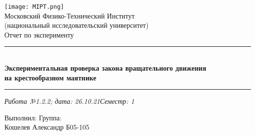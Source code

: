 \documentclass[12pt,a4paper]{scrartcl}
\begin{document}
	\graphicspath{{C:/Users/Alex/OneDrive/Изображения/TexImgs}}
	
	\newcommand{\ms}{\mathstrut}
	\newcommand{\msp}{\hspace{0.5cm}}
	\newcommand{\al}{\alpha}
	\newcommand{\dg}{^\circ}
	\newcommand{\qd}[2]{^{\frac{#1}{#2}}}
	\newcommand{\qdm}[2]{^{-\frac{#1}{#2}}}
	\newcommand{\lm}[2]{\underset{#1 \rightarrow #2}{\lim}}
	\newcommand{\sfrac}[2]{\dfrac{\strut #1}{\strut #2}}
	\newcommand{\equal}[1]{\overset{(#1)}{=}}
	\newcommand{\linevdots}{\ \raisebox{-.08\height}{\vdots}\ }
	\newcommand{\linecvdots}{\ \raisebox{-.08\height}{\vdots}\hspace{-0.13cm}\raisebox{.15\height}{\cancel{\phantom{a}}\hspace{0.06cm}}}
	\newcommand{\combox}[1]{\ms \msp \msp \begin{minipage}{0.95\linewidth}
			#1
	\end{minipage}}
	
	\newtheorem{pr}{Задача}
	\newtheorem{ex}{Пример}
	\newtheorem{dfn}{Def}
	\newtheorem{theorem}{Th}
	
	\newenvironment{slv}{\ms \msp \textit{Решение:}}{}
	\newenvironment{proof}{\ms \msp \textit{Доказательство: }}{\hfill $\square$}
	
	\begin{titlepage}
		
		\vspace*{\fill}
		
		\begin{center}
			\texttt{[image: MIPT.png]}
			\\[0.7cm]\Huge Московский Физико-Технический Институт\\(национальный исследовательский университет)
			\\[2cm]\LARGE Отчет по эксперименту
			\\[0.5cm]\noindent\rule{\textwidth}{1pt}
			\\\Huge\textbf{Экспериментальная проверка закона вращательного движения\\на крестообразном маятнике}
			\\[-0.5cm]\noindent\rule{\textwidth}{1pt}
		\end{center}
		
		\begin{flushleft}
			\textit{Работа №1.2.2; дата: 26.10.21}\hfill\textit{Семестр: 1}
		\end{flushleft}
		
		\vspace*{\fill}
		
		\begin{flushleft}
			Выполнил: \hspace{\fill} Группа:
			\\Кошелев Александр \hspace{\fill} Б05-105
		\end{flushleft}
	\end{titlepage}
	
\end{document}
